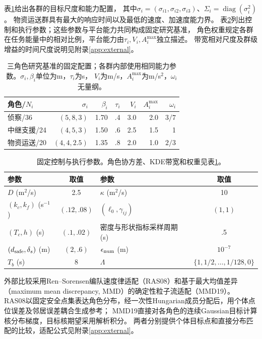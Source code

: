 \documentclass[UTF8,a4paper,11pt,fontset=none]{ctexart}
\newcommand{\diag}{\operatorname{diag}}\newcommand{\col}{\operatorname{col}}
\begin{document}
表\ref{tab:platforms}给出各群的目标尺度和能力配置，
其中$\sigma_i=(\sigma_{i1},\sigma_{i2},\sigma_{i3})$、$\Sigma_i=\diag(\sigma_i^2)$。
物资运送群具有最大的响应时间以及最低的速度、加速度能力界。
表\ref{tab:parameter-origin}列出控制和执行参数；这些参数与平台能力共同构成固定研究基准，
角色权重规定各群在任务能量中的相对比例，平台能力由$\tau_i,V_i,A_i^{\max}$独立描述。
带宽相对尺度及群级增益的时间尺度说明见附录\ref{app:external}。
\begin{table}[htbp]\centering\small
\caption{三角色研究基准的固定配置；各群内部使用相同能力参数。$\sigma_i,\beta_i$单位为m，$\tau_i$为s，
$V_i$为m/s，$A_i^{\max}$为m/s$^2$，$\omega_i$无量纲。}\label{tab:platforms}
\begin{tabular}{@{}lrrrrrr@{}}\toprule
角色/$N_i$ &$\sigma_i$&$\beta_i$&$\tau_i$&$V_i$&$A_i^{\max}$&$\omega_i$\\\midrule
侦察/36 & $(5,8,3)$&1.70&.4&3.0&2.0&$3/7$\\
中继支援/24 & $(4,5,3)$&1.50&.6&2.5&1.5&1\\
物资运送/20 & $(4,4,2.5)$&1.35&.8&2.0&1.0&$2/3$\\
\bottomrule
\end{tabular}
\end{table}
\begin{table}[htbp]\centering\small
\caption{固定控制与执行参数。角色协方差、KDE带宽和权重见表\ref{tab:platforms}。}
\label{tab:parameter-origin}
\begin{tabular}{@{}lclc@{}}\toprule
参数&取值&参数&取值\\\midrule
$D$ (m$^2$/s)&2.5&$\kappa$ (m$^2$/s)&10\\
$(k_c,k_f)$ (s$^{-1}$)&$(.12,.08)$&$(\ell_0,\gamma_{ij})$&$(1,1)$\\
$(T_c,h)$ (s)&$(.1,.02)$&密度与形状指标采样周期 (s)&.5\\
$(d_{\rm safe},\delta_s)$ (m)&$(2,.6)$&$\epsilon_{\rm num}$ (m)&$10^{-7}$\\
$T_b$ (s)&8&$\Lambda$&$\{1,1/2,\ldots,1/128,0\}$\\\bottomrule
\end{tabular}\end{table}


外部比较采用Ren--Sorensen编队速度律适配（RAS08）\cite{ren2008}和基于最大均值差异
（maximum mean discrepancy, MMD）的确定性粒子流适配（MMD19）\cite{arbel2019}。
RAS08以固定安全点集表达角色分布，经一次性Hungarian成员分配后，用个体点位误差及邻居误差耦合生成参考；
MMD19直接对各角色的连续Gaussian目标计算核分布梯度，目标核期望采用解析积分。
两者分别提供个体目标点和直接分布匹配的比较，适配公式见附录\ref{app:external}。
\end{document}
